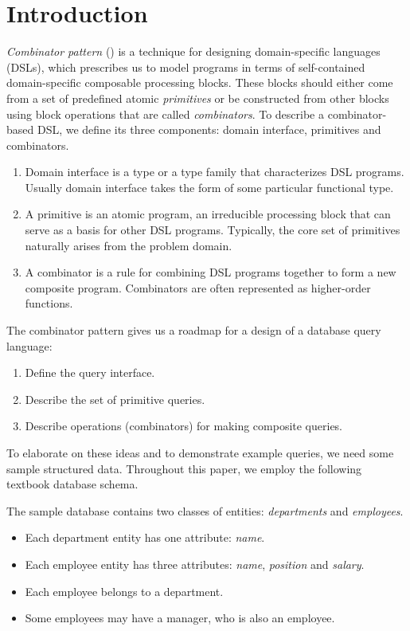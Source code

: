 
\section{Introduction}

\emph{Combinator pattern} (\cite{Barrientos2009}) is a technique for designing
domain-specific languages (DSLs), which prescribes us to model programs in
terms of self-contained domain-specific composable processing blocks.  These
blocks should either come from a set of predefined atomic \emph{primitives} or
be constructed from other blocks using block operations that are called
\emph{combinators}.  To describe a combinator-based DSL, we define its three
components: domain interface, primitives and combinators.

\begin{enumerate}
\item
Domain interface is a type or a type family that characterizes DSL programs.
Usually domain interface takes the form of some particular functional type.
\item
A primitive is an atomic program, an irreducible processing block that can
serve as a basis for other DSL programs.  Typically, the core set of primitives
naturally arises from the problem domain.
\item
A combinator is a rule for combining DSL programs together to form a new
composite program.  Combinators are often represented as higher-order
functions.
\end{enumerate}

The combinator pattern gives us a roadmap for a design of a database query
language:

\begin{enumerate}
\item
Define the query interface.
\item
Describe the set of primitive queries.
\item
Describe operations (combinators) for making composite queries.
\end{enumerate}

To elaborate on these ideas and to demonstrate example queries, we need some
sample structured data.  Throughout this paper, we employ the following
textbook database schema.

The sample database contains two classes of entities: \emph{departments} and
\emph{employees}.

\begin{itemize}
\item
Each department entity has one attribute: \emph{name}.
\item
Each employee entity has three attributes: \emph{name}, \emph{position} and
\emph{salary}.
\item
Each employee belongs to a department.
\item
Some employees may have a manager, who is also an employee.
\end{itemize}

